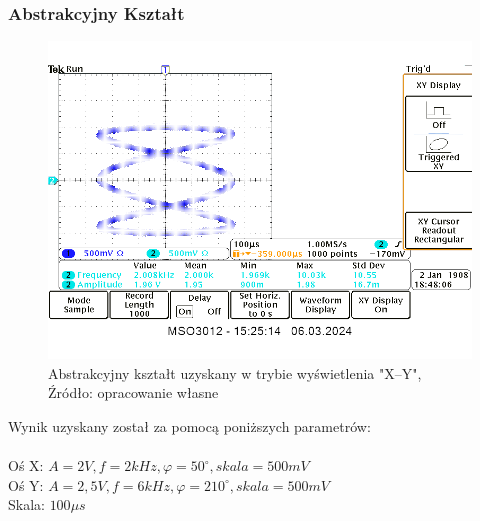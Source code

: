 \documentclass{article}
\begin{document}
        \subsubsection{Abstrakcyjny Kształt}
        \begin{figure}[!ht]
          \begin{center}
              \includegraphics[scale=0.25]{grafiki/cos.png}
              \caption{Abstrakcyjny kształt uzyskany w trybie wyświetlenia "X--Y",\\Źródło: opracowanie własne}
          \end{center}
        \end{figure}
        Wynik uzyskany został za pomocą poniższych parametrów: \\ \\
        Oś X: $A = 2V,f = 2kHz, \varphi = 50^\circ, skala = 500mV$ \\
        Oś Y: $A = 2,5V,f = 6kHz, \varphi = 210^\circ, skala = 500mV$ \\
        Skala: $100 \mu s$
\end{document}
